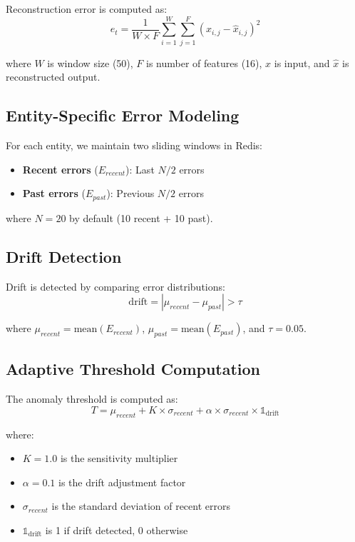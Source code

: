 \documentclass[conference]{IEEEtran}
\begin{document}
Reconstruction error is computed as:
\begin{equation}
e_t = \frac{1}{W \times F} \sum_{i=1}^{W} \sum_{j=1}^{F} (x_{i,j} - \hat{x}_{i,j})^2
\end{equation}

where $W$ is window size (50), $F$ is number of features (16), $x$ is input, and $\hat{x}$ is reconstructed output.

\subsection{Entity-Specific Error Modeling}

For each entity, we maintain two sliding windows in Redis:

\begin{itemize}
\item \textbf{Recent errors} ($E_{recent}$): Last $N/2$ errors
\item \textbf{Past errors} ($E_{past}$): Previous $N/2$ errors
\end{itemize}

where $N = 20$ by default (10 recent + 10 past).

\subsection{Drift Detection}

Drift is detected by comparing error distributions:
\begin{equation}
\text{drift} = |\mu_{recent} - \mu_{past}| > \tau
\end{equation}

where $\mu_{recent} = \text{mean}(E_{recent})$, $\mu_{past} = \text{mean}(E_{past})$, and $\tau = 0.05$.

\subsection{Adaptive Threshold Computation}

The anomaly threshold is computed as:
\begin{equation}
T = \mu_{recent} + K \times \sigma_{recent} + \alpha \times \sigma_{recent} \times \mathbb{1}_{\text{drift}}
\end{equation}

where:
\begin{itemize}
\item $K = 1.0$ is the sensitivity multiplier
\item $\alpha = 0.1$ is the drift adjustment factor
\item $\sigma_{recent}$ is the standard deviation of recent errors
\item $\mathbb{1}_{\text{drift}}$ is 1 if drift detected, 0 otherwise
\end{itemize}
\end{document}
